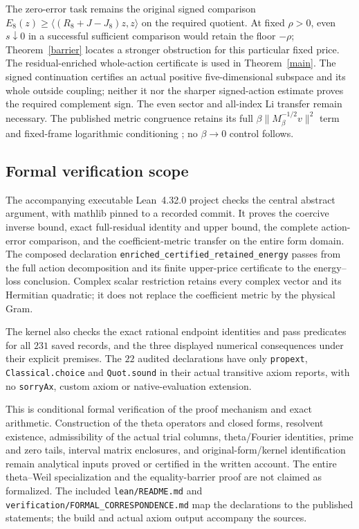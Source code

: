 \documentclass[12pt]{article}
\theoremstyle{remark}\newtheorem{remark}[theorem]{Remark}
\begin{document}
The zero-error task remains the original signed comparison
$E_8(z)\ge\langle(R_8+J-J_8)z,z\rangle$ on the required quotient.
At fixed $\rho>0$, even $s\downarrow0$ in a successful sufficient
comparison would retain the floor $-\rho$; Theorem~\ref{barrier}
locates a stronger obstruction for this particular fixed price.
The residual-enriched whole-action certificate is used in
Theorem~\ref{main}. The signed continuation certifies an actual positive
five-dimensional subspace and its whole outside coupling; neither it
nor the sharper signed-action estimate proves the required complement sign. The even sector and all-index Li transfer remain
necessary. The published metric congruence retains its full
$\beta\|M_\beta^{-1/2}v\|^2$ term and fixed-frame logarithmic
conditioning \cite[Proposition 7.1]{Theta}; no $\beta\to0$ control follows.

\subsection{Formal verification scope}
The accompanying executable Lean~4.32.0 project checks the central
abstract argument, with mathlib pinned to a recorded commit. It proves
the coercive inverse bound, exact full-residual identity and upper bound,
the complete action-error comparison, and the coefficient-metric
transfer on the entire form domain. The composed declaration
\texttt{enriched\_certified\_retained\_energy} passes from the full action
decomposition and its finite upper-price certificate to the
energy--loss conclusion. Complex scalar restriction retains every
complex vector and its Hermitian quadratic; it does not replace the
coefficient metric by the physical Gram.

The kernel also checks the exact rational endpoint identities and pass
predicates for all $231$ saved records, and the three displayed numerical
consequences under their explicit premises. The $22$ audited declarations
have only \texttt{propext}, \texttt{Classical.choice} and
\texttt{Quot.sound} in their actual transitive axiom reports, with no
\texttt{sorryAx}, custom axiom or native-evaluation extension.

This is conditional formal verification of the proof mechanism and exact
arithmetic. Construction of the theta operators and closed forms,
resolvent existence, admissibility of the actual trial columns,
theta/Fourier identities, prime and zero tails, interval matrix enclosures,
and original-form/kernel identification remain analytical inputs proved
or certified in the written account. The entire theta--Weil specialization
and the equality-barrier proof are not claimed as formalized.
The included \texttt{lean/README.md} and
\texttt{verification/FORMAL\_CORRESPONDENCE.md} map the declarations to the
published statements; the build and actual axiom output accompany the sources.
\end{document}
